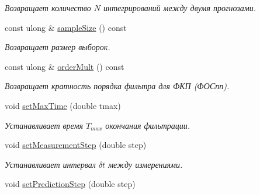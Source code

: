 \begin{DoxyCompactItemize}
\begin{DoxyCompactList}\small\item\em Возвращает количество $N$ интегрирований между двумя прогнозами. \end{DoxyCompactList}\item 
const ulong \& \hyperlink{class_core_1_1_filter_parameters_a879401aa0aa48b363fd35b3d85eced43}{sample\+Size} () const \hypertarget{class_core_1_1_filter_parameters_a879401aa0aa48b363fd35b3d85eced43}{}\label{class_core_1_1_filter_parameters_a879401aa0aa48b363fd35b3d85eced43}

\begin{DoxyCompactList}\small\item\em Возвращает размер выборок. \end{DoxyCompactList}\item 
const ulong \& \hyperlink{class_core_1_1_filter_parameters_a4294f7904cbaaac16768cbb8c2a9e40c}{order\+Mult} () const \hypertarget{class_core_1_1_filter_parameters_a4294f7904cbaaac16768cbb8c2a9e40c}{}\label{class_core_1_1_filter_parameters_a4294f7904cbaaac16768cbb8c2a9e40c}

\begin{DoxyCompactList}\small\item\em Возвращает кратность порядка фильтра для ФКП (ФОСпп). \end{DoxyCompactList}\item 
void \hyperlink{class_core_1_1_filter_parameters_a649fb04817a251986e9bffb264b3a22a}{set\+Max\+Time} (double tmax)\hypertarget{class_core_1_1_filter_parameters_a649fb04817a251986e9bffb264b3a22a}{}\label{class_core_1_1_filter_parameters_a649fb04817a251986e9bffb264b3a22a}

\begin{DoxyCompactList}\small\item\em Устанавливает время $T_{max}$ окончания фильтрации. \end{DoxyCompactList}\item 
void \hyperlink{class_core_1_1_filter_parameters_a53a29d979978514b85078f3d7263c947}{set\+Measurement\+Step} (double step)\hypertarget{class_core_1_1_filter_parameters_a53a29d979978514b85078f3d7263c947}{}\label{class_core_1_1_filter_parameters_a53a29d979978514b85078f3d7263c947}

\begin{DoxyCompactList}\small\item\em Устанавливает интервал $\delta t$ между измерениями. \end{DoxyCompactList}\item 
void \hyperlink{class_core_1_1_filter_parameters_abc28925f9ee2213da37a000dc761cb05}{set\+Prediction\+Step} (double step)\hypertarget{class_core_1_1_filter_parameters_abc28925f9ee2213da37a000dc761cb05}{}\label{class_core_1_1_filter_parameters_abc28925f9ee2213da37a000dc761cb05}


\end{DoxyCompactItemize}
